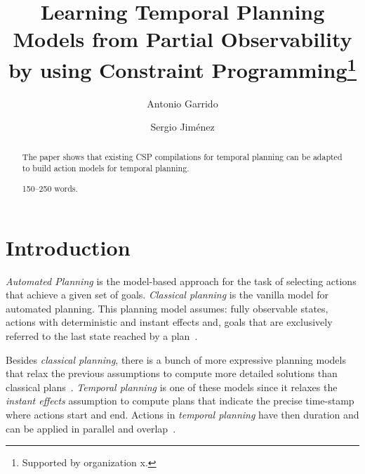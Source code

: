 \documentclass[runningheads]{llncs}
\begin{document}
%
\title{Learning Temporal Planning Models from Partial Observability by using Constraint Programming\thanks{Supported by organization x.}}

%
%
\author{Antonio Garrido \and
Sergio Jim\'enez}
%
%
%
\maketitle              %
%
\begin{abstract}

The paper shows that existing CSP compilations for temporal planning can be adapted to build action models for temporal planning.


150--250 words.

\end{abstract}
%
%
%
\section{Introduction}
\label{sec:introduction}
{\em Automated Planning} is the model-based approach for the task of selecting actions that achieve a given set of goals. {\em Classical planning} is the vanilla model for automated planning. This planning model assumes: fully observable states, actions with deterministic and instant effects and, goals that are exclusively referred to the last state reached by a plan~\cite{geffner2013concise}.

Besides {\em classical planning}, there is a bunch of more expressive planning models that relax the previous assumptions to compute more detailed solutions than classical plans~\cite{ghallab2004automated}. {\em Temporal planning} is one of these models since it relaxes the {\em instant effects} assumption to compute plans that indicate the precise time-stamp where actions start and end. Actions in {\em temporal planning} have then duration and can be applied in parallel and overlap~\cite{cushing2007temporal}.
\end{document}

